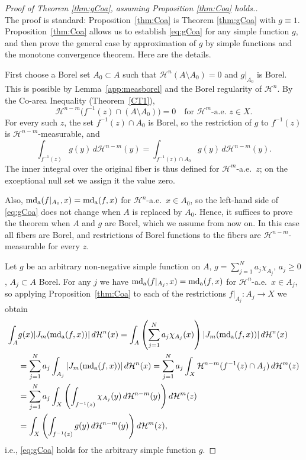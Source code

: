 \documentclass[12pt,leqno]{amsart}
\theoremstyle{definition}
\def\H{{\mathcal H}}
\def\apmd{\operatorname{md_{\rm a}}}
\numberwithin{theorem}{section} \numberwithin{equation}{section}
\begin{document}
\begin{proof}[Proof of Theorem \ref{thm:gCoa}, assuming Proposition \ref{thm:Coa} holds.]\mbox{}\\
The proof is standard: Proposition~\ref{thm:Coa} is Theorem \ref{thm:gCoa} with $g\equiv 1$. Proposition~\ref{thm:Coa} allows us to establish \eqref{eq:gCoa} for any simple function $g$, and then prove the general case by approximation of $g$ by simple functions and the monotone convergence theorem. Here are the details.

First choose a Borel set $A_0\subset A$ such that $\H^n(A\setminus A_0)=0$ and $g|_{A_0}$ is Borel. This is possible by Lemma~\ref{app:measborel} and the Borel regularity of $\H^n$. By the Co-area Inequality (Theorem~\ref{CT1}),
$$
\H^{n-m}\big(f^{-1}(z)\cap(A\setminus A_0)\big)=0
\quad\text{for $\H^m$-a.e.\ $z\in X$.}
$$
For every such $z$, the set $f^{-1}(z)\cap A_0$ is Borel, so the restriction of $g$ to $f^{-1}(z)$ is $\H^{n-m}$-measurable, and
$$
\int_{f^{-1}(z)}g(y)\,d\H^{n-m}(y)
=\int_{f^{-1}(z)\cap A_0}g(y)\,d\H^{n-m}(y).
$$
The inner integral over the original fiber is thus defined for $\H^m$-a.e.\ $z$; on the exceptional null set we assign it the value zero.

Also, $\apmd(f|_{A_0},x)=\apmd(f,x)$ for $\H^n$-a.e.\ $x\in A_0$, so the left-hand side of \eqref{eq:gCoa} does not change when $A$ is replaced by $A_0$. Hence, it suffices to prove the theorem when $A$ and $g$ are Borel, which we assume from now on. In this case all fibers are Borel, and restrictions of Borel functions to the fibers are $\H^{n-m}$-measurable for every $z$.

Let $g$ be an arbitrary non-negative simple function on $A$, $g=\sum_{j=1}^N a_j\chi_{A_j}$, $a_j\geq 0$, $A_j\subset A$ Borel.  For any $j$ we have $\apmd(f|_{A_j},x)=\apmd(f,x)$ for $\H^n$-a.e.\ $x\in A_j$, so applying Proposition~\ref{thm:Coa} to each of the restrictions  $f|_{A_j}:A_j\to X$  we obtain
\begin{equation*}\begin{split}
\int_{A}&g(x)|J_m(\apmd(f,x))|\,d\H^n(x)=\int_{A}\left(\sum_{j=1}^N a_j\chi_{A_j}(x)\right)|J_m(\apmd(f,x))|\,d\H^n(x)\\
    &=\sum_{j=1}^N a_j\int_{A_j} |J_m(\apmd(f,x))|\,d\H^n(x)=\sum_{j=1}^N a_j \int_X \H^{n-m}(f^{-1}(z)\cap A_j)\,d\H^m(z)\\
    &=\sum_{j=1}^N a_j\int_X
    \left(
        \int_{f^{-1}(z)}\chi_{A_j}(y)\,d\H^{n-m}(y)
    \right)d\H^m(z)\\
    &=\int_X\left(\int_{f^{-1}(z)}g(y)\,d\H^{n-m}(y)
    \right)d\H^m(z),
\end{split}
\end{equation*}
i.e., \eqref{eq:gCoa} holds for the arbitrary simple function $g$.


\end{proof}
\end{document}
